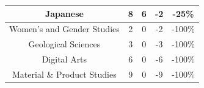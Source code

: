 \documentclass[10pt]{article}
\begin{document}
\begin{longtable}[c]{|ccccc|}
	\multicolumn{1}{|c|}{Japanese}                                   & \multicolumn{1}{c|}{8}                               & \multicolumn{1}{c|}{6}                                   & \multicolumn{1}{c|}{-2}                 & -25\%                 \\ \hline
	\multicolumn{1}{|c|}{Women's and Gender Studies}                 & \multicolumn{1}{c|}{2}                               & \multicolumn{1}{c|}{0}                                   & \multicolumn{1}{c|}{-2}                 & -100\%                \\ \hline
	\multicolumn{1}{|c|}{Geological Sciences}                        & \multicolumn{1}{c|}{3}                               & \multicolumn{1}{c|}{0}                                   & \multicolumn{1}{c|}{-3}                 & -100\%                \\ \hline
	\multicolumn{1}{|c|}{Digital Arts}                               & \multicolumn{1}{c|}{6}                               & \multicolumn{1}{c|}{0}                                   & \multicolumn{1}{c|}{-6}                 & -100\%                \\ \hline
	\multicolumn{1}{|c|}{Material \& Product Studies}                & \multicolumn{1}{c|}{9}                               & \multicolumn{1}{c|}{0}                                   & \multicolumn{1}{c|}{-9}                 & -100\%                \\ \hline
\end{longtable}
\end{document}
